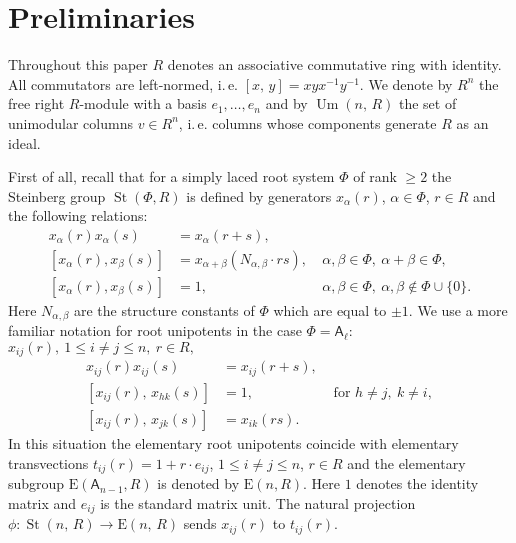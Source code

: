 \documentclass[11pt]{amsart}
\theoremstyle{plain} \declaretheorem[name=Theorem, Refname={Theorem,Theorems}]{tm} \Crefname{tm}{Theorem}{Theorems}
\numberwithin{equation}{section}
\theoremstyle{definition} \newtheorem{df}[lm]{Definition} \Crefname{df}{Definition}{Definitions}
\theoremstyle{remark} \newtheorem{rk}[lm]{Remark} \Crefname{rk}{Remark}{Remarks}
\newcommand{\E}{{\mathrm{E}}}
\newcommand{\Um}{\mathop{\mathrm{Um}}\nolimits}
\newcommand{\St}{\mathop{\mathrm{St}}\nolimits}
\newcommand{\inv}{^{-1}}
\newcommand{\rA}{\mathsf{A}}
\begin{document}
\section{Preliminaries} \label{sec:prelim}
Throughout this paper $R$ denotes an associative commutative ring with identity.
All commutators are left-normed, i.\,e. $[x,\,y]=xyx\inv y\inv$. 
We denote by $R^n$ the free right $R$-module with a basis $e_1,\ldots,e_n$ and by $\Um(n,\,R)$ the set of unimodular columns $v\in R^n$, i.\,e. 
columns whose components generate $R$ as an ideal.

First of all, recall that for a simply laced root system $\Phi$ of rank $\geq 2$ the Steinberg group $\St(\Phi, R)$ 
is defined by generators $x_\alpha(r)$, $\alpha\in\Phi$, $r\in R$ and the following relations:
\begin{align}
 x_\alpha(r) x_\alpha(s) & = x_\alpha(r+s), & \nonumber \\
 [x_\alpha(r),  x_\beta(s)] & = x_{\alpha+\beta}(N_{\alpha,\beta}\cdot rs), &\ \alpha,\beta\in \Phi,\ \alpha+\beta\in\Phi, \nonumber \\
 [x_\alpha(r),  x_\beta(s)] & = 1, &\ \alpha,\beta\in \Phi,\ \alpha, \beta \not \in \Phi \cup \{0\}. \nonumber
\end{align}
Here $N_{\alpha,\beta}$ are the structure constants of $\Phi$ which are equal to $\pm 1$.
We use a more familiar notation for root unipotents in the case $\Phi=\rA_\ell$:
$x_{ij}(r),\ 1\leq i\neq j\leq n,\ r\in R,$
\setcounter{equation}{0}
\renewcommand{\theequation}{S\arabic{equation}}
\begin{align}
x_{ij}(r)x_{ij}(s)      & = x_{ij}(r+s),& \label{add0}\\
[x_{ij}(r),\,x_{hk}(s)] & = 1,& \text{ for }h\neq j,\ k\neq i, \label{ccf1}\\
[x_{ij}(r),\,x_{jk}(s)] & = x_{ik}(rs).& \label{ccf2}
\end{align}
In this situation the elementary root unipotents coincide with elementary transvections $t_{ij}(r)=1+r \cdot e_{ij}$, $1\leq i\neq j\leq n$, $r\in R$
and the elementary subgroup $\E(\rA_{n-1}, R)$ is denoted by $\E(n, R)$.
Here $1$ denotes the identity matrix and $e_{ij}$ is the standard matrix unit. 
The natural projection $\phi\colon\St(n,\,R)\rightarrow\E(n,\,R)$ sends $x_{ij}(r)$ to $t_{ij}(r)$.
\end{document}
